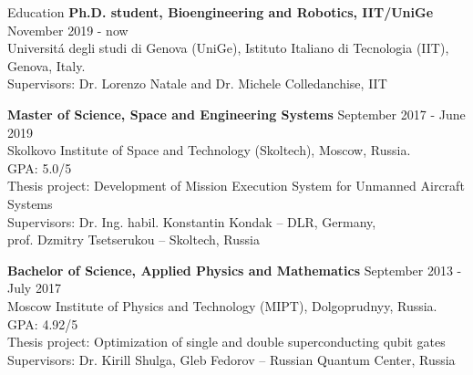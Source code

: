 \documentclass{resume} %
\begin{document}



\begin{rSection}{Education}
{\bf Ph.D. student, Bioengineering and Robotics, IIT/UniGe} \hfill {November 2019 - now}
\\ 
Universit\'a degli studi di Genova (UniGe), Istituto Italiano di Tecnologia (IIT), Genova, Italy.
\\
{Supervisors: Dr. Lorenzo Natale and Dr. Michele Colledanchise, IIT }


{\bf Master of Science, Space and Engineering Systems} \hfill {September 2017 - June 2019}
\\ 
Skolkovo Institute of Space and Technology (Skoltech), Moscow, Russia.
\\
GPA: 5.0/5
\\
{Thesis project: Development of Mission Execution System for Unmanned Aircraft Systems}
\\
{Supervisors: Dr. Ing. habil. Konstantin Kondak -- DLR, Germany,\\} 
{prof. Dzmitry Tsetserukou -- Skoltech, Russia}

{\bf Bachelor of Science, Applied Physics and Mathematics} \hfill {September 2013 - July 2017}
\\ 
Moscow Institute of Physics and Technology (MIPT), Dolgoprudnyy, Russia.
\\
GPA: 4.92/5
\\
Thesis project: Optimization of single and double superconducting qubit gates 
\\
Supervisors: Dr. Kirill Shulga, Gleb Fedorov -- Russian Quantum Center, Russia



\end{rSection}
\end{document}
